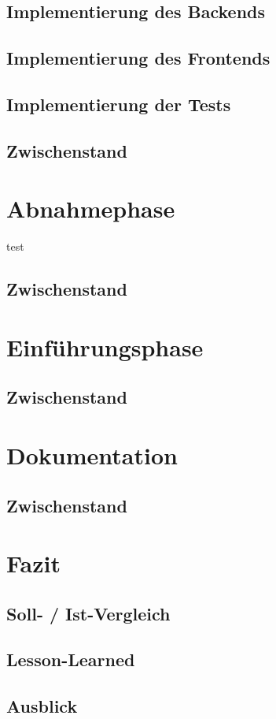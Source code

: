 \documentclass[12pt, xcolor=dvipsnames]{scrartcl}
\begin{document}
\subsection{Implementierung des Backends}

\subsection{Implementierung des Frontends}

\subsection{Implementierung der Tests}

\subsection{Zwischenstand}

\section{Abnahmephase}
	test

\subsection{Zwischenstand}

\section{Einführungsphase}

\subsection{Zwischenstand}


\section{Dokumentation}

\subsection{Zwischenstand}

\section{Fazit}

\subsection{Soll- / Ist-Vergleich}

\subsection{Lesson-Learned}

\subsection{Ausblick}

\newpage


\end{document}
